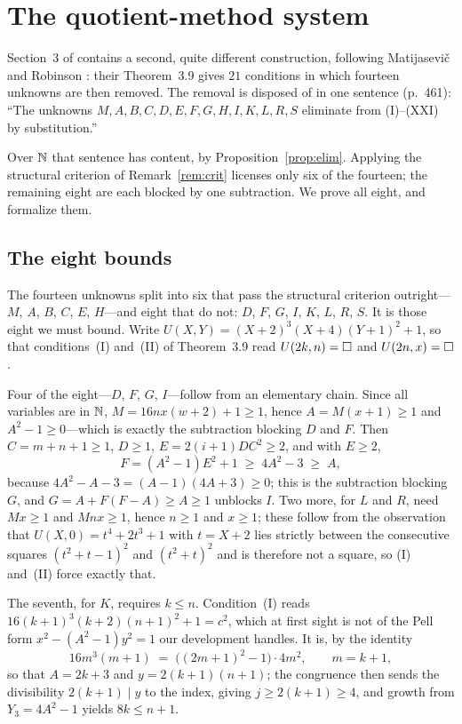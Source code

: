 \section{The quotient-method system}
\label{sec:sec3}

Section~3 of \cite{jsww1976} contains a second, quite different construction,
following Matijasevi\v{c} and Robinson \cite{mr1975}: their Theorem~3.9 gives
$21$ conditions in which fourteen unknowns are then removed. The removal is
disposed of in one sentence (p.~461): ``The unknowns $M,A,B,C,D,E,F,G,H,I,K,L,R,S$
eliminate from (I)--(XXI) by substitution.''

Over $\mathbb{N}$ that sentence has content, by Proposition~\ref{prop:elim}. Applying
the structural criterion of Remark~\ref{rem:crit} licenses only six of the
fourteen; the remaining eight are each blocked by one subtraction. We prove all
eight, and formalize them.

\subsection{The eight bounds}

The fourteen unknowns split into six that pass the structural criterion
outright---$M$, $A$, $B$, $C$, $E$, $H$---and eight that do not: $D$, $F$, $G$,
$I$, $K$, $L$, $R$, $S$. It is those eight we must bound. Write
$U(X,Y)=(X+2)^3(X+4)(Y+1)^2+1$, so that conditions~(I) and~(II) of
Theorem~3.9 read $U(2k,n)=\square$ and $U(2n,x)=\square$.

Four of the eight---$D$, $F$, $G$, $I$---follow from an elementary chain. Since all variables are in $\mathbb{N}$,
$M=16nx(w+2)+1\ge1$, hence $A=M(x+1)\ge1$ and $A^2-1\ge0$---which is exactly the
subtraction blocking $D$ and $F$. Then $C=m+n+1\ge1$, $D\ge1$,
$E=2(i+1)DC^2\ge2$, and with $E\ge2$,
\[
  F=(A^2-1)E^2+1 \;\ge\; 4A^2-3 \;\ge\; A ,
\]
because $4A^2-A-3=(A-1)(4A+3)\ge0$; this is the subtraction blocking $G$, and
$G=A+F(F-A)\ge A\ge1$ unblocks $I$. Two more, for $L$ and $R$, need $Mx\ge1$ and
$Mnx\ge1$, hence $n\ge1$ and $x\ge1$; these follow from the observation that
$U(X,0)=t^4+2t^3+1$ with $t=X+2$ lies strictly between the consecutive squares
$(t^2+t-1)^2$ and $(t^2+t)^2$ and is therefore not a square, so (I) and~(II)
force exactly that.

The seventh, for $K$, requires $k\le n$. Condition~(I) reads
$16(k+1)^3(k+2)(n+1)^2+1=c^2$, which at first sight is not of the Pell form
$x^2-(A^2-1)y^2=1$ our development handles. It is, by the identity
\[
  16m^3(m+1) \;=\; \bigl((2m+1)^2-1\bigr)\cdot 4m^2 , \qquad m=k+1,
\]
so that $A=2k+3$ and $y=2(k+1)(n+1)$; the congruence then sends the divisibility
$2(k+1)\mid y$ to the index, giving $j\ge2(k+1)\ge4$, and growth from
$Y_3=4A^2-1$ yields $8k\le n+1$.

